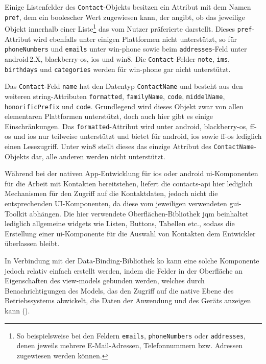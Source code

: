 Einige Listenfelder des \lstinline|Contact|-Objekts besitzen ein Attribut mit dem Namen \lstinline|pref|, dem ein boolescher Wert zugewiesen kann, der angibt, ob das jeweilige Objekt innerhalb einer Liste\footnote{So beispielsweise bei den Feldern \lstinline|emails|, \lstinline|phoneNumbers| oder \lstinline|addresses|, denen jeweils mehrere E-Mail-Adressen, Telefonnummern bzw. Adressen zugewiesen werden können.} das vom Nutzer präferierte darstellt.
Dieses \lstinline|pref|-Attribut wird ebenfalls unter einigen Plattformen nicht unterstützt, so \zB für \lstinline|phoneNumbers| und \lstinline|emails| unter \gls{win-phone} sowie beim \lstinline|addresses|-Feld unter \gls{android}\,2.X, \gls{blackberry-os}, \gls{ios} und \gls{win8}.
Die \lstinline|Contact|-Felder \mbox{\lstinline|note|,} \mbox{\lstinline|ims|,} \lstinline|birthdays| und \lstinline|categories| werden für \gls{win-phone} gar nicht unterstützt.

Das \og \lstinline|Contact|-Feld \lstinline|name| hat den Datentyp \lstinline|ContactName| und besteht aus den weiteren \gls{string}-Attributen \mbox{\lstinline|formatted|,} \mbox{\lstinline|familyName|,} \mbox{\lstinline|code|,} \mbox{\lstinline|middelName|,} \lstinline|honorificPrefix| und \lstinline|code|.
Grundlegend wird dieses Objekt zwar von allen elementaren Plattformen unterstützt, doch auch hier gibt es einige Einschränkungen.
Das \lstinline|formatted|-Attribut wird unter \gls{android}, \gls{blackberry-os}, \gls{ff-os} und \gls{ios} nur teilweise unterstützt und bietet für \gls{android}, \gls{ios} sowie \gls{ff-os} lediglich einen Lesezugriff.
Unter \gls{win8} stellt dieses das einzige Attribut des \lstinline|ContactName|-Objekts dar, alle anderen werden nicht unterstützt.

Während bei der nativen App-Entwicklung für \gls{ios} oder \gls{android} \gls{ui}-Kom\-po\-nen\-ten für die Arbeit mit Kontakten bereitstehen, liefert die \gls{contacts-api} hier lediglich Mechanismen für den Zugriff auf die Kontaktdaten, jedoch nicht die entsprechenden UI-Komponenten, da diese vom jeweiligen verwendeten \gls{gui}-Toolkit abhängen.
Die hier verwendete Oberflächen-Bibliothek \gls{jqm} beinhaltet lediglich allgemeine \glspl{widget} wie Listen, Buttons, Tabellen etc., sodass die Erstellung einer \gls{ui}-Komponente für die Auswahl von Kontakten dem Entwickler überlassen bleibt.

In Verbindung mit der Data-Binding-Bibliothek \gls{ko} kann eine solche Komponente jedoch relativ einfach erstellt werden, indem die Felder in der Oberfläche an Eigenschaften des \glspl{view-model} gebunden werden, welches durch Benachrichtigungen des Models, das den Zugriff auf die native Ebene des Betriebssystems abwickelt, die Daten der Anwendung und des Geräts anzeigen kann ().

